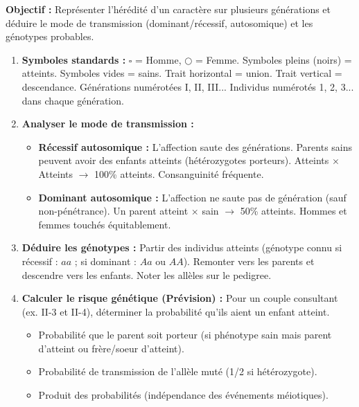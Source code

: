 \documentclass[11pt]{article}
\begin{document}
\begin{methode}
    \textbf{Objectif :} Représenter l'hérédité d'un caractère sur plusieurs générations et déduire le mode de transmission (dominant/récessif, autosomique) et les génotypes probables.
    \begin{enumerate}
        \item \textbf{Symboles standards :} $\square$ = Homme, $\bigcirc$ = Femme. Symboles pleins (noirs) = atteints. Symboles vides = sains. Trait horizontal = union. Trait vertical = descendance. Générations numérotées I, II, III... Individus numérotés 1, 2, 3... dans chaque génération.
        \item \textbf{Analyser le mode de transmission :}
            \begin{itemize}
                \item \textbf{Récessif autosomique :} L'affection saute des générations. Parents sains peuvent avoir des enfants atteints (hétérozygotes porteurs). Atteints $\times$ Atteints $\to$ 100\% atteints. Consanguinité fréquente.
                \item \textbf{Dominant autosomique :} L'affection ne saute pas de génération (sauf non-pénétrance). Un parent atteint $\times$ sain $\to$ 50\% atteints. Hommes et femmes touchés équitablement.
            \end{itemize}
        \item \textbf{Déduire les génotypes :} Partir des individus atteints (génotype connu si récessif : $aa$ ; si dominant : $Aa$ ou $AA$). Remonter vers les parents et descendre vers les enfants. Noter les allèles sur le pedigree.
        \item \textbf{Calculer le risque génétique (Prévision) :} Pour un couple consultant (ex. II-3 et II-4), déterminer la probabilité qu'ils aient un enfant atteint.
            \begin{itemize}
                \item Probabilité que le parent soit porteur (si phénotype sain mais parent d'atteint ou frère/soeur d'atteint).
                \item Probabilité de transmission de l'allèle muté (1/2 si hétérozygote).
                \item Produit des probabilités (indépendance des événements méiotiques).
            \end{itemize}
    \end{enumerate}
\end{methode}
\end{document}
